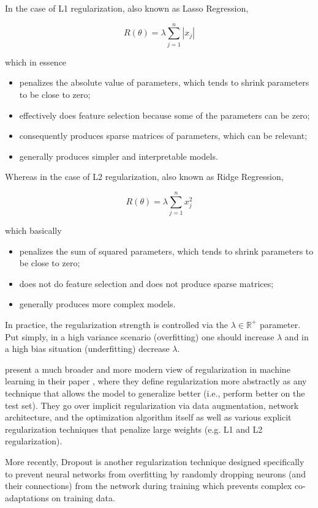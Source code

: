 In the case of L1 regularization, also known as Lasso Regression,

$$
R(\theta) = \lambda \sum_{j=1}^{n} |x_j|
$$

which in essence

\begin{itemize}
    \item penalizes the absolute value of parameters, which tends to shrink parameters to be close to zero;
    \item effectively does feature selection because some of the parameters can be zero;
    \item consequently produces sparse matrices of parameters, which can be relevant;
    \item generally produces simpler and interpretable models.
\end{itemize}

Whereas in the case of L2 regularization, also known as Ridge Regression,

$$
R(\theta) = \lambda \sum_{j=1}^{n} x_j^2
$$

which basically

\begin{itemize}
    \item penalizes the sum of squared parameters, which tends to shrink parameters to be close to zero;
    \item does not do feature selection and does not produce sparse matrices;
    \item generally produces more complex models.
\end{itemize}

In practice, the regularization strength is controlled via the $\lambda \in \mathbb{{R}^{+}}$ parameter. Put simply, in a high variance scenario (overfitting) one should increase $\lambda$ and in a high bias situation (underfitting) decrease $\lambda$.

\citeauthor{regularizationsurvey} present a much broader and more modern view of regularization in machine learning in their \citeyear{regularizationsurvey} paper \cite{regularizationsurvey}, where they define regularization more abstractly as any technique that allows the model to generalize better (i.e., perform better on the test set). They go over implicit regularization via data augmentation, network architecture, and the optimization algorithm itself as well as various explicit regularization techniques that penalize large weights (e.g. L1 and L2 regularization).

More recently, Dropout \cite{dropout} is another regularization technique designed specifically to prevent neural networks from overfitting by randomly dropping neurons (and their connections) from the network during training which prevents complex co-adaptations on training data.

